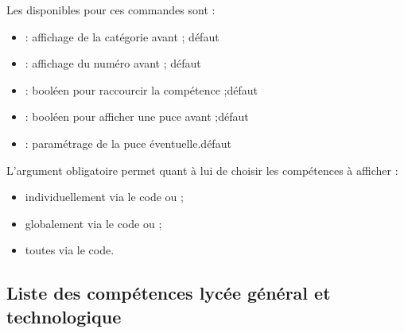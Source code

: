 \begin{cautionblock}
Les  disponibles pour ces commandes sont :

\begin{itemize}
	\item {} : affichage de la catégorie avant ; \hfill{}défaut 
	\item {} : affichage du numéro avant ; \hfill{}défaut 
	\item {} : booléen pour raccourcir la compétence ;\hfill{}défaut 
	\item {} : booléen pour afficher une puce avant ;\hfill{}défaut 
	\item {} : paramétrage de la puce éventuelle.\hfill{}défaut 
\end{itemize}

L'argument obligatoire permet quant à lui de choisir les compétences à afficher :

\begin{itemize}
	\item individuellement via le code  ou  ;
	\item globalement via le code  ou  ;
	\item toutes via le code.
\end{itemize}
\vspace*{-\baselineskip}\leavevmode
\end{cautionblock}

\subsection{Liste des compétences lycée général et technologique}


